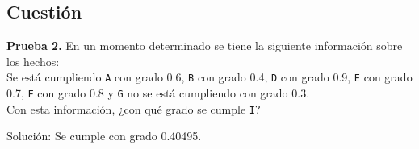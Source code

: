 \subsection{Cuestión}
\begin{ejer}
	\textbf{Prueba 2.} En un momento determinado se tiene la siguiente información sobre los hechos:\\
	Se está cumpliendo \texttt{A} con grado 0.6, \texttt{B} con grado 0.4, \texttt{D} con grado 0.9, 
	\texttt{E} con grado 0.7, \texttt{F} con grado 0.8 y \texttt{G} no se está cumpliendo con grado 0.3. \\
	Con esta información, ¿con qué grado se cumple \texttt{I}?
\end{ejer}
\par Solución: Se cumple con grado 0.40495.